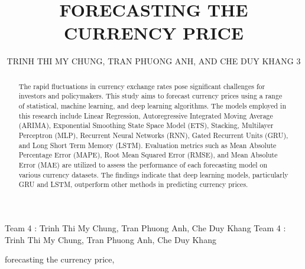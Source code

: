 \documentclass{ieeeojies}
\begin{document}
\title{FORECASTING THE CURRENCY PRICE}

\author{\uppercase{Trinh Thi My Chung},
\uppercase{Tran Phuong Anh, and Che Duy Khang 3}}

\address[1]{Faculty of Information Systems, University of Information Technology, (e-mail: 21520653@gm.uit.edu.vn)}
\address[2]{Faculty of Information Systems, University of Information Technology, (e-mail: 21520595@gm.uit.edu.vn)}
\address[3]{Faculty of Information Systems, University of Information Technology, (e-mail: 21522187@gm.uit.edu.vn)}

\markboth
{Team 4 \headeretal: Trinh Thi My Chung, Tran Phuong Anh, Che Duy Khang}
{Team 4 \headeretal: Trinh Thi My Chung, Tran Phuong Anh, Che Duy Khang}

\begin{abstract}

The rapid fluctuations in currency exchange rates pose significant challenges for investors and policymakers. This study aims to forecast currency prices using a range of statistical, machine learning, and deep learning algorithms. The models employed in this research include Linear Regression, Autoregressive Integrated Moving Average (ARIMA), Exponential Smoothing State Space Model (ETS), Stacking, Multilayer Perceptron (MLP), Recurrent Neural Networks (RNN), Gated Recurrent Units (GRU), and Long Short Term Memory (LSTM). Evaluation metrics such as Mean Absolute Percentage Error (MAPE), Root Mean Squared Error (RMSE), and Mean Absolute Error (MAE) are utilized to assess the performance of each forecasting model on various currency datasets. The findings indicate that deep learning models, particularly GRU and LSTM, outperform other methods in predicting currency prices.
\end{abstract}

\begin{keywords}

forecasting the currency price, 
\end{keywords}

\titlepgskip=-15pt

\maketitle
\end{document}
